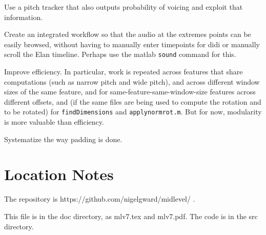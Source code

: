 \documentclass[11pt]{article}
\begin{document}
Use a pitch tracker that also outputs probability of voicing and
exploit that information.

Create an integrated workflow so that the audio at the extremes points
can be easily browsed, without having to manually enter timepoints for
didi or manually scroll the Elan timeline.  Perhaps use the matlab
{\tt sound} command for this.

Improve efficiency.  In particular, work is repeated across features
that share computations (such as narrow pitch and wide pitch), and
across different window sizes of the same feature, and for
same-feature-same-window-size features across different offsets, and
(if the same files are being used to compute the rotation and to be
rotated) for {\tt findDimensions} and {\tt applynormrot.m}.  But for
now, modularity is more valuable than efficiency.

Systematize the way padding is done. 

%


\section{Location Notes}            \label{sec:location}

The repository is https://github.com/nigelgward/midlevel/ .

This file is in the doc directory, as mlv7.tex and mlv7.pdf.  The code
is in the src directory. 



%
  

\end{document}
